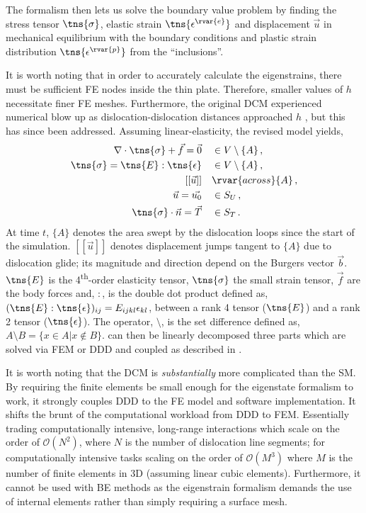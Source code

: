 The formalism then lets us solve the boundary value problem by finding the stress tensor $ \tns{\sigma} $, elastic strain $ \tns{\epsilon^{\rvar{e}}} $ and displacement $ \vec{u} $ in mechanical equilibrium with the boundary conditions and plastic strain distribution $ \tns{\epsilon^{\rvar{p}}} $ from the ``inclusions''.

It is worth noting that in order to accurately calculate the eigenstrains, there must be sufficient FE nodes inside the thin plate. Therefore, smaller values of $ h $ necessitate finer FE meshes. Furthermore, the original DCM experienced numerical blow up as dislocation-dislocation distances approached $ h $ \cite{dcm0}, but this has since been addressed. Assuming linear-elasticity, the revised model \cite{dcm} yields,
\begin{subequations}\label{eq:discrete_continuum}
    \begin{align}
        \nabla \cdot \tns{\sigma} + \vec{f} = \vec{0} \quad & \in V \setminus \{A\}\,, \\
        \tns{\sigma} = \tns{E} : \tns{\epsilon} \quad       & \in V \setminus \{A\}\,, \\
        [[\vec{u}]] \quad                                   & \rvar{across } \{A\}\,,  \\
        \vec{u} = \vec{u_{0}} \quad                         & \in S_{U}\,,             \\
        \tns{\sigma} \cdot \vec{n} = \vec{T} \quad          & \in S_{T}\,.
    \end{align}
\end{subequations}
At time $ t $, $ \{A\} $ denotes the area swept by the dislocation loops since the start of the simulation. $ [[\vec{u}]] $ denotes displacement jumps tangent to $ \{A\} $ due to dislocation glide; its magnitude and direction depend on the Burgers vector $ \vec{b} $. $ \tns{E} $ is the 4\textsuperscript{th}-order elasticity tensor, $ \tns{\sigma} $ the small strain tensor, $ \vec{f} $ are the body forces and, $ : $, is the double dot product defined as, $ (\tns{E}:\tns{\epsilon})_{ij} = E_{ijkl}\epsilon_{kl} $, between a rank 4 tensor ($ \tns{E} $) and a rank 2 tensor ($ \tns{\epsilon} $). The operator, $ \setminus $, is the set difference defined as, $ A \setminus B = \{x \in A | x \notin B\} $.  can then be linearly decomposed three parts which are solved via FEM or DDD and coupled as described in \cite{dcm}.

It is worth noting that the DCM is \emph{substantially} more complicated than the SM. By requiring the finite elements be small enough for the eigenstate formalism to work, it strongly couples DDD to the FE model and software implementation. It shifts the brunt of the computational workload from DDD to FEM. Essentially trading computationally intensive, long-range interactions which scale on the order of $ \mathcal{O}(N^{2}) $, where $ N $ is the number of dislocation line segments; for computationally intensive tasks scaling on the order of $ \mathcal{O}(M^{3}) $ where $ M $ is the number of finite elements in 3D (assuming linear cubic elements). Furthermore, it cannot be used with BE methods as the eigenstrain formalism demands the use of internal elements rather than simply requiring a surface mesh.

